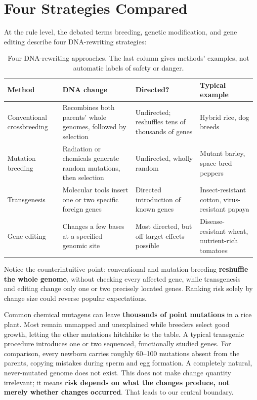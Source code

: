 \section{Four Strategies Compared}

At the rule level, the debated terms breeding, genetic modification, and gene editing describe four DNA-rewriting strategies:

\begin{table}[htbp]
\centering
\small
\begin{tabular}{@{}p{2.6cm}p{4.6cm}p{2.6cm}p{3.2cm}@{}}
\toprule
Method & DNA change & Directed? & Typical example \\
\midrule
Conventional crossbreeding & Recombines both parents' whole genomes, followed by selection & Undirected; reshuffles tens of thousands of genes & Hybrid rice, dog breeds \\
Mutation breeding & Radiation or chemicals generate random mutations, then selection & Undirected, wholly random & Mutant barley, space-bred peppers \\
Transgenesis & Molecular tools insert one or two specific foreign genes & Directed introduction of known genes & Insect-resistant cotton, virus-resistant papaya \\
Gene editing & Changes a few bases at a specified genomic site & Most directed, but off-target effects possible & Disease-resistant wheat, nutrient-rich tomatoes \\
\bottomrule
\end{tabular}
\caption{Four DNA-rewriting approaches. The last column gives methods' examples, not automatic labels of safety or danger.}
\end{table}

Notice the counterintuitive point: conventional and mutation breeding \textbf{reshuffle the whole genome}, without checking every affected gene, while transgenesis and editing change only one or two precisely located genes. Ranking risk solely by change size could reverse popular expectations.

\begin{qiaoliang}
Common chemical mutagens can leave \textbf{thousands of point mutations} in a rice plant. Most remain unmapped and unexplained while breeders select good growth, letting the other mutations hitchhike to the table. A typical transgenic procedure introduces one or two sequenced, functionally studied genes. For comparison, every newborn carries roughly 60--100 mutations absent from the parents, copying mistakes during sperm and egg formation. A completely natural, never-mutated genome does not exist. This does not make change quantity irrelevant; it means \textbf{risk depends on what the changes produce, not merely whether changes occurred}. That leads to our central boundary.
\end{qiaoliang}

